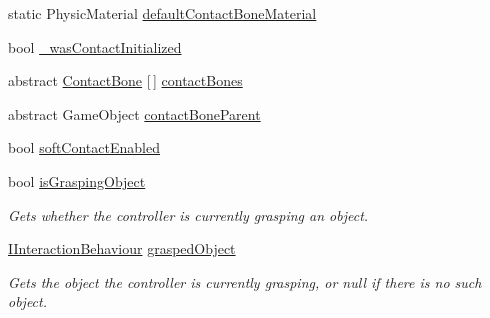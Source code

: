 \begin{DoxyCompactItemize}
\item 
static Physic\+Material \mbox{\hyperlink{class_leap_1_1_unity_1_1_interaction_1_1_interaction_controller_ab4e6b3b0d4793ea376619f9dc452b9f4}{default\+Contact\+Bone\+Material}}
\item 
bool \mbox{\hyperlink{class_leap_1_1_unity_1_1_interaction_1_1_interaction_controller_ad42f1bf4fa7ae05e23a3fbc314c6020f}{\+\_\+was\+Contact\+Initialized}}
\item 
abstract \mbox{\hyperlink{class_leap_1_1_unity_1_1_interaction_1_1_contact_bone}{Contact\+Bone}} \mbox{[}$\,$\mbox{]} \mbox{\hyperlink{class_leap_1_1_unity_1_1_interaction_1_1_interaction_controller_a3a38ed3721ae2338689cf256c789b691}{contact\+Bones}}
\item 
abstract Game\+Object \mbox{\hyperlink{class_leap_1_1_unity_1_1_interaction_1_1_interaction_controller_a5e1d7a2a31f10a9f1a2fe49ddd37bf75}{contact\+Bone\+Parent}}
\item 
bool \mbox{\hyperlink{class_leap_1_1_unity_1_1_interaction_1_1_interaction_controller_a7efdf9619c04ed13e0f223c12c6ae429}{soft\+Contact\+Enabled}}
\item 
bool \mbox{\hyperlink{class_leap_1_1_unity_1_1_interaction_1_1_interaction_controller_afd400c908dffa22a7fb025f067df34e5}{is\+Grasping\+Object}}
\begin{DoxyCompactList}\small\item\em Gets whether the controller is currently grasping an object. \end{DoxyCompactList}\item 
\mbox{\hyperlink{interface_leap_1_1_unity_1_1_interaction_1_1_i_interaction_behaviour}{I\+Interaction\+Behaviour}} \mbox{\hyperlink{class_leap_1_1_unity_1_1_interaction_1_1_interaction_controller_aecfb55af7f506df76774eac811ad25fc}{grasped\+Object}}
\begin{DoxyCompactList}\small\item\em Gets the object the controller is currently grasping, or null if there is no such object. \end{DoxyCompactList}\item 

\end{DoxyCompactItemize}
